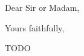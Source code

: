 \documentclass[11pt,a4paper,sans]{moderncv}
\begin{document}
\date{01 January, 2016}
\opening{Dear Sir or Madam,}
\closing{Yours faithfully,}

\makelettertitle

TODO

\makeletterclosing
\end{document}
